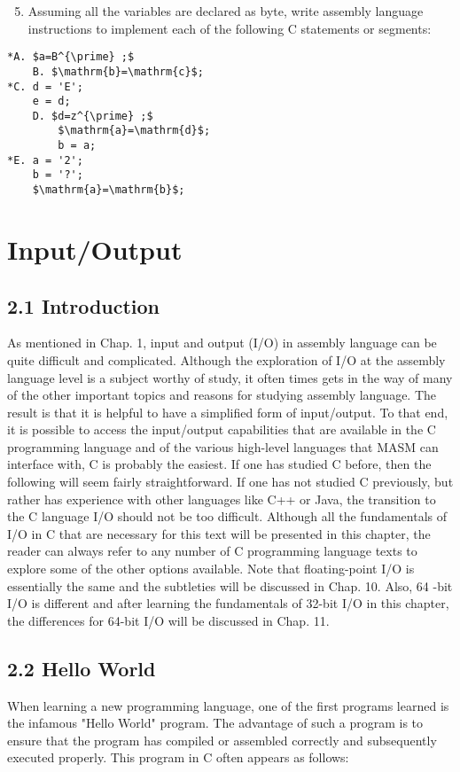 \documentclass[10pt]{article}
\begin{document}
\begin{enumerate}
  \setcounter{enumi}{4}
  \item Assuming all the variables are declared as byte, write assembly language instructions to implement each of the following C statements or segments:
\end{enumerate}

\begin{verbatim}
*A. $a=B^{\prime} ;$
    B. $\mathrm{b}=\mathrm{c}$;
*C. d = 'E';
    e = d;
    D. $d=z^{\prime} ;$
        $\mathrm{a}=\mathrm{d}$;
        b = a;
*E. a = '2';
    b = '?';
    $\mathrm{a}=\mathrm{b}$;
\end{verbatim}

\section*{Input/Output}
\subsection*{2.1 Introduction}
As mentioned in Chap. 1, input and output (I/O) in assembly language can be quite difficult and complicated. Although the exploration of I/O at the assembly language level is a subject worthy of study, it often times gets in the way of many of the other important topics and reasons for studying assembly language. The result is that it is helpful to have a simplified form of input/output. To that end, it is possible to access the input/output capabilities that are available in the C programming language and of the various high-level languages that MASM can interface with, C is probably the easiest. If one has studied C before, then the following will seem fairly straightforward. If one has not studied C previously, but rather has experience with other languages like C++ or Java, the transition to the C language I/O should not be too difficult. Although all the fundamentals of I/O in C that are necessary for this text will be presented in this chapter, the reader can always refer to any number of C programming language texts to explore some of the other options available. Note that floating-point I/O is essentially the same and the subtleties will be discussed in Chap. 10. Also, 64 -bit I/O is different and after learning the fundamentals of 32-bit I/O in this chapter, the differences for 64-bit I/O will be discussed in Chap. 11.

\subsection*{2.2 Hello World}
When learning a new programming language, one of the first programs learned is the infamous "Hello World" program. The advantage of such a program is to ensure that the program has compiled or assembled correctly and subsequently executed properly. This program in C often appears as follows:
\end{document}
